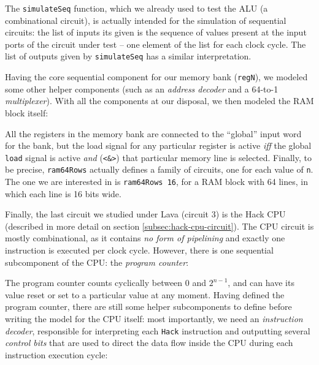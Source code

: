 \documentclass[a4paper]{article}
\begin{document}
                The \texttt{simulateSeq} function, which we already used to test the ALU (a
                combinational circuit), is actually intended for the simulation of sequential
                circuits: the list of inputs its given is the sequence of values present at the
                input ports of the circuit under test -- one element of the list for each clock
                cycle. The list of outputs given by \texttt{simulateSeq} has a similar
                interpretation.

                Having the core sequential component for our memory bank (\texttt{regN}), we modeled
                some other helper components (such as an \emph{address decoder} and a 64-to-1
                \emph{multiplexer}). With all the components at our disposal, we then modeled the
                RAM block itself:
                

                All the registers in the memory bank are connected to the ``global'' input word for
                the bank, but the load signal for any particular register is active \emph{iff} the
                global \texttt{load} signal is active \emph{and} (\texttt{<\&>}) that particular
                memory line is selected. Finally, to be precise, \texttt{ram64Rows} actually defines
                a family of circuits, one for each value of \texttt{n}. The one we are interested in
                is \texttt{ram64Rows 16}, for a RAM block with 64 lines, in which each line is 16
                bits wide.

                Finally, the last circuit we studied under Lava (circuit 3) is the Hack CPU
                (described in more detail on section \ref{subsec:hack-cpu-circuit}). The CPU circuit
                is mostly combinational, as it contains \emph{no form of pipelining} and
                exactly one instruction is executed per clock cycle. However, there is one
                sequential subcomponent of the CPU: the \emph{program counter}:
                

                The program counter counts cyclically between $ 0 $ and $ 2^{n-1} $, and can have
                its value reset or set to a particular value at any moment. Having defined the
                program counter, there are still some helper subcomponents to define before writing
                the model for the CPU itself: most importantly, we need an \emph{instruction
                    decoder}, responsible for interpreting each \texttt{Hack} instruction and
                outputting several \emph{control bits} that are used to direct the data flow inside
                the CPU during each instruction execution cycle:
                
\end{document}

